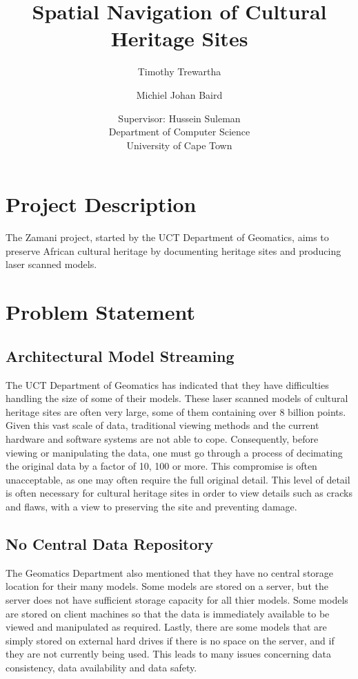 \documentclass[12pt,a4paper]{article}
\begin{document}
\author{Timothy Trewartha \\
\and		
Michiel Johan Baird \\
\and
Supervisor: Hussein Suleman \\
Department of Computer Science \\
University of Cape Town 
 }
\title{Spatial Navigation of Cultural Heritage Sites}
\maketitle
{}
\tableofcontents
\newpage

\section{Project Description}
The Zamani project, started by the UCT Department of Geomatics, aims to preserve African cultural heritage by documenting heritage sites and producing laser scanned models.

\section{Problem Statement}
\subsection{Architectural Model Streaming}
The UCT Department of Geomatics has indicated that they have difficulties handling the size of some of their models. These laser scanned models of cultural heritage sites are often very large, some of them containing over 8 billion points. Given this vast scale of data, traditional viewing methods and the current hardware and software systems are not able to cope.  Consequently, before viewing or manipulating the data, one must go through a process of decimating the original data by a factor of 10, 100 or more. This compromise is often unacceptable, as one may often require the full original detail. This level of detail is often necessary for cultural heritage sites in order to view details such as cracks and flaws, with a view to preserving the site and preventing damage.
\subsection{No Central Data Repository}
The Geomatics Department also mentioned that they have no central storage location for their many models. Some models are stored on a server, but the server does not have sufficient storage capacity for all thier models. Some models are stored on client machines so that the data is immediately available to be viewed and manipulated as required. Lastly, there are some models that are simply stored on external hard drives if there is no space on the server, and if they are not currently being used. This leads to many issues concerning data consistency, data availability and data safety.
\end{document}
